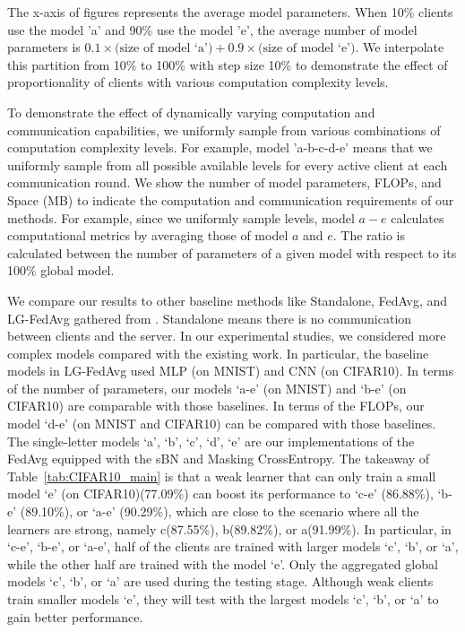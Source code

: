 \documentclass{article} %
\begin{document}
The x-axis of figures represents the average model parameters. When 10\% clients use the model 'a' and 90\% use the model 'e', the average number of model parameters is $0.1\times\text{(size of model `a')} + 0.9\times\text{(size of model `e')}$. We interpolate this partition from 10\% to 100\% with step size 10\% to demonstrate the effect of proportionality of clients with various computation complexity levels.

To demonstrate the effect of dynamically varying computation and communication capabilities, we uniformly sample from various combinations of computation complexity levels. For example, model 'a-b-c-d-e' means that we uniformly sample from all possible available levels for every active client at each communication round. We show the number of model parameters, FLOPs, and Space (MB) to indicate the computation and communication requirements of our methods. For example, since we uniformly sample levels, model $a-e$ calculates computational metrics by averaging those of model $a$ and $e$. The ratio is calculated between the number of parameters of a given model with respect to its 100\% global model. 

We compare our results to other baseline methods like Standalone, FedAvg, and LG-FedAvg gathered from \citep{liang2020think}. Standalone means there is no communication between clients and the server. In our experimental studies, we considered more complex models compared with the existing work. In particular, the baseline models in LG-FedAvg used MLP (on MNIST) and CNN (on CIFAR10). In terms of the number of parameters, our models `a-e' (on MNIST) and `b-e' (on CIFAR10) are comparable with those baselines. In terms of the FLOPs, our model `d-e' (on MNIST and CIFAR10) can be compared with those baselines. The single-letter models `a', `b', `c', `d', `e' are our implementations of the FedAvg equipped with the sBN and Masking CrossEntropy. The takeaway of Table~\ref{tab:CIFAR10_main} is that a weak learner that can only train a small model `e' (on CIFAR10)(77.09\%) can boost its performance to `c-e' (86.88\%), `b-e' (89.10\%), or `a-e' (90.29\%), which are close to the scenario where all the learners are strong, namely c(87.55\%),  b(89.82\%), or a(91.99\%). In particular, in `c-e', `b-e', or `a-e', half of the clients are trained with larger models `c', `b', or `a', while the other half are trained with the model `e'. Only the aggregated global models `c', `b', or `a' are used during the testing stage. Although weak clients train smaller models `e', they will test with the largest models `c', `b', or `a' to gain better performance.
\end{document}
